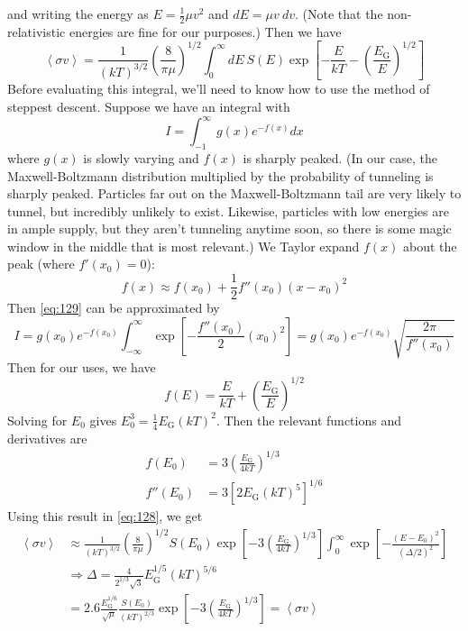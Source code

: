 \documentclass[10pt]{article}
\numberwithin{equation}{section}
\newcommand{\avg}[1]{\left\langle#1\right\rangle}
\begin{document}
  and writing the energy as $E=\frac{1}{2}\mu v^2$ and $dE=\mu v\
  dv$. (Note that the non-relativistic energies are fine for our
  purposes.) Then we have
  \begin{equation}
    \label{eq:128}
    \avg{\sigma
      v}=\frac{1}{(kT)^{3/2}}\left(\frac{8}{\pi\mu}\right)^{1/2}\int_0^\infty
    dE\ S(E)\exp\left[-\frac{E}{kT}-\left(\frac{E_\mathrm{G}}{E}\right)^{1/2}\right]
  \end{equation}
  Before evaluating this integral, we'll need to know how to use the
  method of steppest descent. Suppose we have an integral with
  \begin{equation}
    \label{eq:129}
    I=\int_{-1}^{\infty}g(x)e^{-f(x)}dx
  \end{equation}
  where $g(x)$ is slowly varying and $f(x)$ is sharply peaked. (In our
  case, the Maxwell-Boltzmann distribution multiplied by the
  probability of tunneling is sharply peaked. Particles far out on the
  Maxwell-Boltzmann tail are very likely to tunnel, but incredibly
  unlikely to exist. Likewise, particles with low energies are in
  ample supply, but they aren't tunneling anytime soon, so there is
  some magic window in the middle that is most relevant.) We Taylor
  expand $f(x)$ about the peak (where $f'(x_0)=0$):
  \begin{equation}
    \label{eq:130}
    f(x)\approx f(x_0)+\frac{1}{2}f''(x_0)(x-x_0)^2
  \end{equation}
  Then \eqref{eq:129} can be approximated by
  \begin{equation}
    \label{eq:131}
    I=g(x_0)e^{-f(x_0)}\int_{-\infty}^{\infty}\exp\left[-\frac{f''(x_0)}{2}(x_0)^2\right]=g(x_0)e^{-f(x_0)}\sqrt{\frac{2\pi}{f''(x_0)}}
  \end{equation}
  Then for our uses, we have
  \begin{equation}
    \label{eq:132}
    f(E)=\frac{E}{kT}+\left(\frac{E_{\mathrm{G}}}{E}\right)^{1/2}
  \end{equation}
  Solving for $E_0$ gives
  $E_0^3=\frac{1}{4}E_{\mathrm{G}}(kT)^2$. Then the relevant functions
  and derivatives are
  \begin{align}
    \label{eq:133}
    f(E_0)&=3\left(\frac{E_{\mathrm{G}}}{4kT}\right)^{1/3}\\
    \label{eq:133a}
    f''(E_0)&=3\left[2E_{\mathrm{G}}(kT)^5\right]^{1/6}
  \end{align}
  Using this result in \eqref{eq:128}, we get
  \begin{align}
    \label{eq:134}
    \avg{\sigma v} & \approx
    \frac{1}{(kT)^{3/2}}\left(\frac{8}{\pi\mu}\right)^{1/2}S(E_0)\exp\left[-3\left(\frac{E_{\mathrm{G}}}{4kT}\right)^{1/3}\right]\int_0^\infty
    \exp\left[-\frac{(E-E_0)^2}{(\Delta/2)^2}\right]\\
    \label{eq:134a}
    & \Rightarrow \boxed{\Delta =
      \frac{4}{2^{1/3}\sqrt{3}}E_{\mathrm{G}}^{1/5}(kT)^{5/6}}\\
    \label{eq:134b}
    &=
    \boxed{2.6\frac{E_{\mathrm{G}}^{1/6}}{\sqrt{\mu}}\frac{S(E_0)}{(kT)^{2/3}}\exp\left[-3\left(\frac{E_{\mathrm{G}}}{4kT}\right)^{1/3}\right]=\avg{\sigma v}}
  \end{align}
\end{document}
